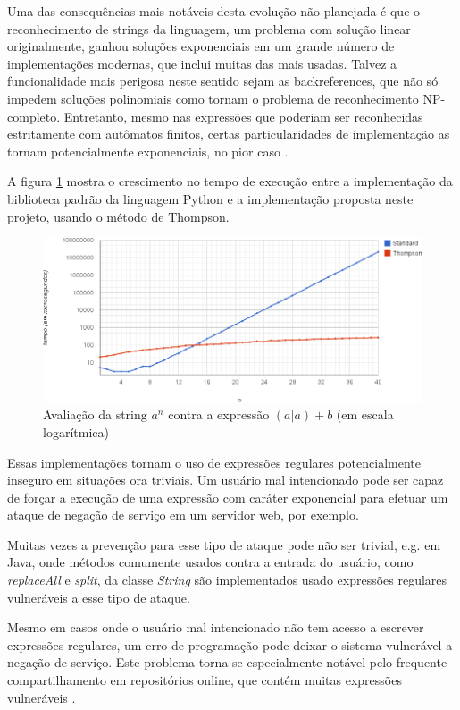 \documentclass[a4paper,12pt,oneside,onecolumn]{uerj}
\begin{document}
Uma das consequências mais notáveis desta evolução não planejada é que o reconhecimento de strings da linguagem, um problema com solução linear originalmente, ganhou soluções exponenciais em um grande número de implementações modernas, que inclui muitas das mais usadas. Talvez a funcionalidade mais perigosa neste sentido sejam as backreferences, que não só impedem soluções polinomiais como tornam o problema de reconhecimento NP-completo. Entretanto, mesmo nas expressões que poderiam ser reconhecidas estritamente com autômatos finitos, certas particularidades de implementação as tornam potencialmente exponenciais, no pior caso \cite{bib:Cox07}.

A figura \ref{fig:benchmark1} mostra o crescimento no tempo de execução entre a implementação da biblioteca padrão da linguagem Python e a implementação proposta neste projeto, usando o método de Thompson. 

\begin{figure}[ht]
  \centering
  \includegraphics[scale=0.5]{figures/benchmark1.png}
  \caption{Avaliação da string $a^n$ contra a expressão $(a|a)+b$ (em escala logarítmica)}
  \label{fig:benchmark1}
\end{figure}

Essas implementações tornam o uso de expressões regulares potencialmente inseguro em situações ora triviais. Um usuário mal intencionado pode ser capaz de forçar a execução de uma expressão com caráter exponencial para efetuar um ataque de negação de serviço em um servidor web, por exemplo. 

Muitas vezes a prevenção para esse tipo de ataque pode não ser trivial, e.g. em Java, onde métodos comumente usados contra a entrada do usuário, como \emph{replaceAll} e \emph{split}, da classe \emph{String} são implementados usado expressões regulares vulneráveis a esse tipo de ataque.

Mesmo em casos onde o usuário mal intencionado não tem acesso a escrever expressões regulares, um erro de programação pode deixar o sistema vulnerável a negação de serviço. Este problema torna-se especialmente notável pelo frequente compartilhamento em repositórios online, que contém muitas expressões vulneráveis \cite{bib:Kirrage13,bib:Weidman10}. 
\end{document}
